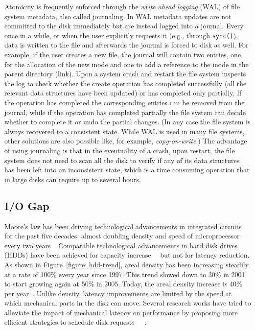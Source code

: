 Atomicity is frequently enforced through the \textit{write ahead logging} (WAL) of file system metadata, also called journaling. In WAL metadata updates are not committed to the disk immediately but are instead logged into a 
journal. Every once in a while, or when the user explicitly requests it (e.g., through \texttt{sync()}), data is written to the file and afterwards the journal is forced to disk as well. For example, if the user creates a 
new file, the journal will contain two entries, one for the allocation of the new inode and one to add a reference to the inode in the parent directory (link). Upon a system crash and restart the file system inspects the 
log to check whether the create operation has completed successfully (all the relevant data structures have been updated) or has completed only partially. If the operation has completed the corresponding entries can be removed 
from the journal, while if the operation has completed partially the file system can decide whether to complete it or undo the partial changes. (In any case the file system is always recovered to a consistent state. While WAL 
is used in many file systems, other solutions are also possible like, for example, \textit{copy-on-write}.) The advantage of using journaling is that in the eventuality of a crash, upon restart, the file system does not need 
to scan all the disk to verify if any of its data structures has been left into an inconsistent state, which is a time consuming operation that in large disks can require up to several hours.

\subsection{I/O Gap}
Moore's law has been driving technological advancements in integrated circuits for the past five decades, almost doubling density and speed of microprocessor every two years~\cite{Mack11}. Comparable technological advancements 
in hard disk drives (HDDs) have been achieved for capacity increase~\cite{Grochowski1996}~\cite{NIST} but not for latency reduction. As shown in Figure~\ref{figure: hdd-trend}, areal density has been increasing steadily at a 
rate of 100\% every year since 1997. This trend slowed down to 30\% in 2001 to start growing again at 50\% in 2005. Today, the areal density increase is 40\% per year~\cite{Masakatsu2015}. Unlike density, latency improvements 
are limited by the speed at which mechanical parts in the disk can move. Several research works have tried to alleviate the impact of mechanical latency on performance by proposing more efficient strategies to schedule disk 
requests~\cite{jacobson1991}~\cite{Worthington1994}~\cite{Iyer2001}.

